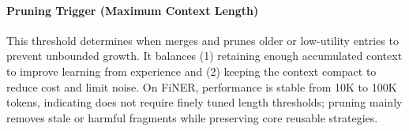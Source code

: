 \begin{table}[!tbhp]
  \centering
  \caption{\textbf{Effect of Deduplication Threshold (FiNER, DeepSeek-V3.1).}}
  \label{tab:ablation-dedup-threshold}
\end{table}

\paragraph{Pruning Trigger (Maximum Context Length)}
This threshold determines when \name merges and prunes older or low-utility entries to prevent unbounded growth. It balances (1) retaining enough accumulated context to improve learning from experience and (2) keeping the context compact to reduce cost and limit noise. On FiNER, performance is stable from 10K to 100K tokens, indicating \name does not require finely tuned length thresholds; pruning mainly removes stale or harmful fragments while preserving core reusable strategies.

